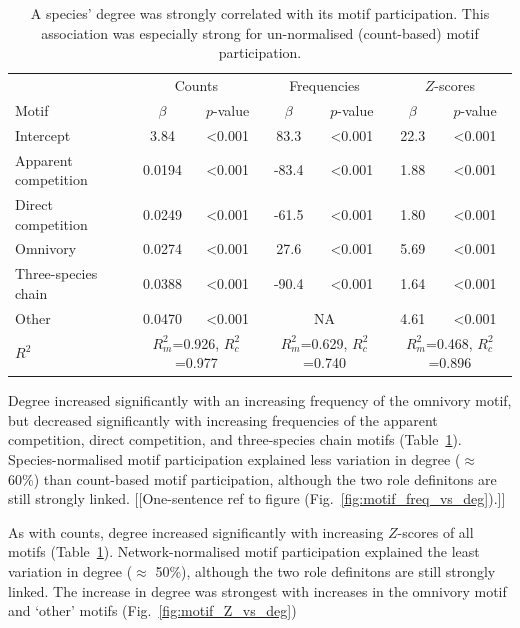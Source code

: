 \documentclass[12pt]{article}
\begin{document}
\begin{spacing}{2.0}
			\begin{table}[h!]
			\caption{A species' degree was strongly correlated with its motif participation. This association was especially strong for un-normalised (count-based) motif participation.}
			\label{tab:motifs_vs_deg}
			\begin{tabular}{l | c c | c c | c c}
			& \multicolumn{2}{|c|}{Counts} & \multicolumn{2}{c}{Frequencies} & \multicolumn{2}{|c}{$Z$-scores} \\
			Motif & $\beta$ & $p$-value & $\beta$ & $p$-value & $\beta$ & $p$-value \\
			\hline
			Intercept &  3.84  & \textless0.001 & 83.3 & \textless0.001 & 22.3 & \textless0.001\\
			\hline
			Apparent competition       &  0.0194  & \textless0.001 & -83.4 & \textless0.001 & 1.88 & \textless0.001 \\
			Direct competition       &  0.0249  & \textless0.001 & -61.5 & \textless0.001 & 1.80 & \textless0.001\\
			Omnivory       &  0.0274  & \textless0.001 & 27.6 & \textless0.001 & 5.69 & \textless0.001\\
			Three-species chain       &  0.0388  & \textless0.001 & -90.4 & \textless0.001 & 1.64 & \textless0.001\\
			Other    &  0.0470  & \textless0.001 & \multicolumn{2}{c|}{NA} & 4.61 & \textless0.001 \\
			\hline
			$R^2$ & \multicolumn{2}{|c|}{$R^2_m$=0.926, $R^2_c$=0.977} & 
			\multicolumn{2}{c}{$R^2_m$=0.629, $R^2_c$=0.740} & 
			\multicolumn{2}{|c}{$R^2_m$=0.468, $R^2_c$=0.896} \\
			\end{tabular}
			\end{table}


			Degree increased significantly with an increasing frequency of the omnivory motif, but decreased significantly with increasing frequencies of the apparent competition, direct competition, and three-species chain motifs (Table~\ref{tab:motifs_vs_deg}).
			Species-normalised motif participation explained less variation in degree ($\approx$ 60\%) than count-based motif participation, although the two role definitons are still strongly linked.
			[[One-sentence ref to figure (Fig.~\ref{fig:motif_freq_vs_deg}).]]


			As with counts, degree increased significantly with increasing $Z$-scores of all motifs (Table~\ref{tab:motifs_vs_deg}).
			Network-normalised motif participation explained the least variation in degree ($\approx$ 50\%), although the two role definitons are still strongly linked.
			The increase in degree was strongest with increases in the omnivory motif and `other' motifs (Fig.~\ref{fig:motif_Z_vs_deg})



\end{spacing}
\end{document}
